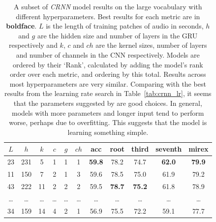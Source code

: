 \begin{table}[H]
    \centering
    \begin{tabular}{ccccccccccc}
        \toprule
        $L$ & $h$ & $k$ & $c$ & $g$ & $ch$ & acc & root & third & seventh & mirex \\
        \midrule
        23 & 231 & 5 & 1 & 1 & 1 & \textbf{59.8} & 78.2 & 74.7 & \textbf{62.0} & \textbf{79.9} \\
        11 & 150 & 7 & 2 & 1 & 3 & 59.6 & 78.5 & 75.0 & 61.9 & 79.2 \\
        43 & 222 & 11 & 2 & 2 & 2 & 59.5 & \textbf{78.7} & \textbf{75.2} & 61.8 & 78.9 \\
        \ldots & \ldots & \ldots & \ldots & \ldots & \ldots & \ldots & \ldots & \ldots & \ldots & \ldots \\
        34 & 159 & 14 & 4 & 2 & 1 & 56.9 & 75.5 & 72.2 & 59.1 & 77.7 \\
        \bottomrule
    \end{tabular}
    \caption{A subset of \emph{CRNN} model results on the large vocabulary with different hyperparameters. Best results for each metric are in \textbf{boldface}. $L$ is the length of training patches of audio in seconds, $h$ and $g$ are the hidden size and number of layers in the GRU respectively and $k$, $c$ and $ch$ are the kernel sizes, number of layers and number of channels in the CNN respectively. Models are ordered by their `Rank', calculated by adding the model's rank order over each metric, and ordering by this total. Results across most hyperparameters are very similar. Comparing with the best results from the learning rate search in Table~\ref{tab:crnn_lr}, it seems that the parameters suggested by \citet{StructuredTraining} are good choices. In general, models with more parameters and longer input tend to perform worse, perhaps due to overfitting. This suggests that the model is learning something simple.}\label{tab:crnn_hparams}
\end{table}



